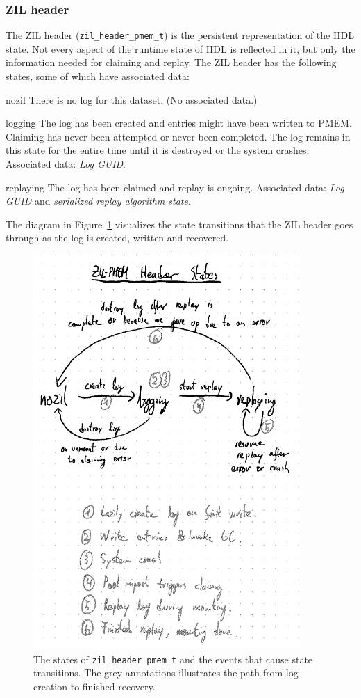 \documentclass[12pt,a4paper,twoside]{book}
\begin{document}
\subsubsection{ZIL header}
The ZIL header (\lstinline{zil_header_pmem_t}) is the persistent representation of the HDL state.
Not every aspect of the runtime state of HDL is reflected in it, but only the information needed for claiming and replay.
The ZIL header has the following states, some of which have associated data:
\begin{description}[noitemsep,leftmargin=1.5cm,labelindent=1cm]
    \item[nozil] There is no log for this dataset. (No associated data.)
    \item[logging] The log has been created and entries might have been written to PMEM.
        Claiming has never been attempted or never been completed.
        The log remains in this state for the entire time until it is destroyed or the system crashes. Associated data: \textit{Log GUID}.
    \item[replaying] The log has been claimed and replay is ongoing. Associated data: \textit{Log GUID} and \textit{serialized replay algorithm state}.
\end{description}
The diagram in Figure~\ref{fig:prb_persistent_structure__header_states_plus_example} visualizes the state transitions that the ZIL header goes through as the log is created, written and recovered.

\begin{figure}
    \includegraphics[height=15cm]{fig/prb_persistent_structure__header_states_plus_example}
    \caption{
        The states of \lstinline{zil_header_pmem_t} and the events that cause state transitions.
        The grey annotations illustrates the path from log creation to finished recovery.}
    \label{fig:prb_persistent_structure__header_states_plus_example}
\end{figure}
\end{document}
